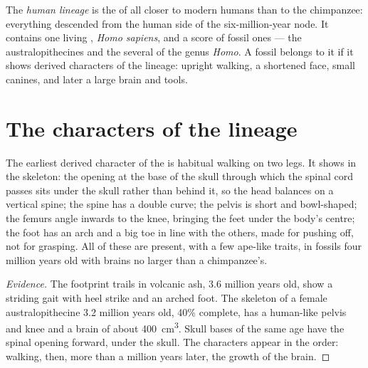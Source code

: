\begin{definition}\label{def:g12:human-evolution:lineage}
The \emph{human lineage} is the  of all
 closer to modern humans than to the chimpanzee: everything
descended from the human side of the six-million-year node. It
contains one living , \emph{Homo sapiens}, and a score of
fossil ones --- the australopithecines and the several  of the
genus \emph{Homo}. A fossil belongs to it if it shows derived
characters of the lineage: upright walking, a shortened face, small
canines, and later a large brain and tools.
\end{definition}

\section{The characters of the lineage}

\begin{proposition}\label{prop:g12:human-evolution:bipedalism}
The earliest derived character of the  is habitual
walking on two legs. It shows in the skeleton: the opening at the base
of the skull through which the spinal cord passes sits under the skull
rather than behind it, so the head balances on a vertical spine; the
spine has a double curve; the pelvis is short and bowl-shaped; the
femurs angle inwards to the knee, bringing the feet under the body's
centre; the foot has an arch and a big toe in line with the others,
made for pushing off, not for grasping. All of these are present, with
a few ape-like traits, in fossils four million years old with brains
no larger than a chimpanzee's.
\end{proposition}
\begin{proof}[Evidence]
The footprint trails in volcanic ash, 3.6 million years old, show a
striding gait with heel strike and an arched foot. The skeleton of a
female australopithecine 3.2 million years old, 40\% complete, has a
human-like pelvis and knee and a brain of about \qty{400}{cm^3}. Skull
bases of the same age have the spinal opening forward, under the
skull. The characters appear in the order: walking, then, more than a
million years later, the growth of the brain.
\end{proof}

